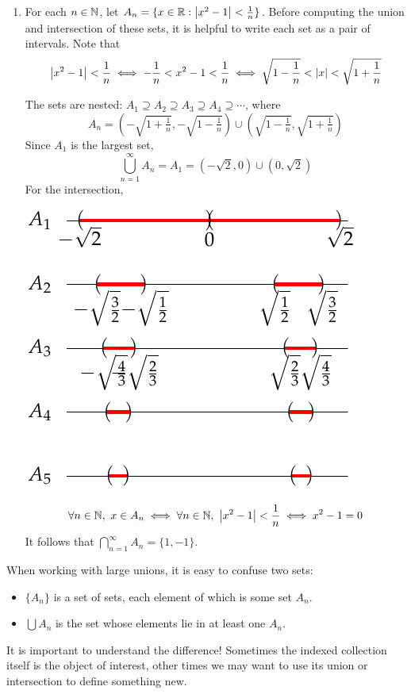 \begin{examples}{}{}
\begin{enumerate}
	
		\item For each $n\in\mathbb{N}$, let $A_n=\{x\in\mathbb{R}:\left| x^2-1\right|<\frac 1n\}$. Before computing the union and intersection of these sets, it is helpful to write each set as a pair of intervals. Note that
	\[
		\left| x^2-1\right|<\frac 1n\iff -\frac 1n< x^2-1<\frac 1n\iff \sqrt{1-\frac 1n}< \left| x\right|< \sqrt{1+\frac 1n}
	\]
	\begin{minipage}[t]{0.6\linewidth}\vspace{0pt}
		The sets are nested: $A_1\supseteq A_2\supseteq A_3\supseteq A_4\supseteq\cdots$, where
		\[
			A_n=\left(-\sqrt{1+\tfrac 1n},-\sqrt{1-\tfrac 1n}\right)\cup\left(\sqrt{1-\tfrac 1n},\sqrt{1+\tfrac 1n}\right)
		\]
		Since $A_1$ is the largest set,
		\[
			\bigcup_{n=1}^\infty A_n=A_1=(-\sqrt{2},0)\cup(0,\sqrt{2})
		\]
		For the intersection,
	\end{minipage}
	\hfill
	\begin{minipage}[t]{0.39\linewidth}\vspace{0pt}
		\hfill\includegraphics{setsii-05-intervalex}
	\end{minipage}
		\[
			\forall n\in\mathbb{N},\ x\in A_n\iff \forall n\in\mathbb{N},\ \left| x^2-1\right|<\frac 1n \iff x^2-1=0
		\]
		It follows that $\bigcap_{n=1}^\infty A_n=\{1,-1\}$.
	\end{enumerate}
\end{examples}



When working with large unions, it is easy to confuse two sets:
\begin{itemize}\itemsep2pt
  \item $\{A_n\}$ is a set of sets, each element of which is some set $A_n$.
  \item $\bigcup A_n$ is the set whose elements lie in at least one $A_n$.
\end{itemize}
It is important to understand the difference! Sometimes the indexed collection itself is the object of interest, other times we may want to use its union or intersection to define something new.




